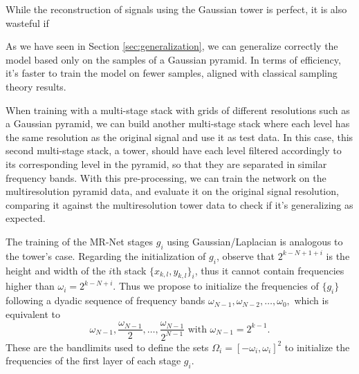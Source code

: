 While the reconstruction of signals using the Gaussian tower is perfect, it is also wasteful if 

As we have seen in Section \ref{sec:generalization}, we can generalize correctly the model based only on the samples of a Gaussian pyramid. In terms of efficiency, it's faster to train the model on fewer samples, aligned with classical sampling theory results. 


When training with a multi-stage stack with grids of different resolutions such as a Gaussian pyramid, we can build another multi-stage stack where each level has the same resolution as the original signal and use it as test data. In this case, this second multi-stage stack, a tower, should have each level filtered accordingly to its corresponding level in the pyramid, so that they are separated in similar frequency bands. With this pre-processing, we can train the network on the multiresolution pyramid data, and evaluate it on the original signal resolution, comparing it against the multiresolution tower data to check if it's generalizing as expected.


The training of the MR-Net stages $g_i$ using Gaussian/Laplacian is analogous to the tower's case.
Regarding the initialization of $g_i$, observe that $2^{k-N+1+i}$ is the height and width of the $i$th stack $\{x_{k,l}, y_{k,l}\}_i$, thus it cannot contain frequencies higher than $\omega_i=2^{k-N+i}$. 
Thus we propose to initialize the frequencies of $\{g_i\}$ following a dyadic sequence of frequency bands 
$\omega_{N-1}, \omega_{N-2}, \ldots, \omega_{0},$
which is equivalent to $$\omega_{N-1}, \frac{\omega_{N-1}}{2}, \ldots, \frac{\omega_{N-1}}{2^{N-1}} \text{ with } \omega_{N-1}= 2^{k-1}.$$
These are the bandlimits used to define the sets $\Omega_i=\left[-\omega_i, \omega_i\right]^2$ to initialize the frequencies of the first layer of each stage $g_i$.



